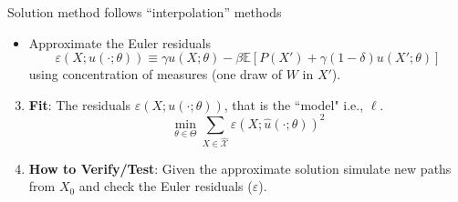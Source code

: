 \documentclass[aspectratio=169,10pt]{beamer}
\newcommand{\emphcolor}[1]{\textbf{\textcolor{emphcolorval}{#1}}}
\newcommand{\expec}[2][]{\ensuremath{\mathbb{E}_{{#1}}\left[ {#2} \right]}}
\newcommand{\Xtrain}{\hat{\mathcal{X}}}
\begin{document}
	\begin{frame}[label= algo]{Solution method follows ``interpolation'' methods}
		\begin{itemize}
			\item Approximate the Euler residuals
			$$\varepsilon\left(X;u(\cdot;\theta)\right) \equiv \gamma u(X;\theta) - \beta \mathbb{E}\left[P(X') +\gamma (1-\delta) u(X';\theta)\right]$$
			\vspace{-0.1in}
			 using concentration of measures (one draw of $W$ in $X'$). \hyperlink{errors}{}
		\end{itemize}
	\begin{enumerate}
		  \setcounter{enumi}{2}
		  \item \emphcolor{Fit}: The residuals $\varepsilon\left(X;u(\cdot;\theta)\right)$, that is the ``model" i.e., $\ell$.
		  $$
		  \min_{\theta \in \Theta} \sum_{X \in \Xtrain} \varepsilon\left(X;\hat{u}(\cdot;\theta)\right)^2
		    $$ 
	    \item  \emphcolor{How to Verify/Test}: Given the approximate solution simulate new paths from $X_0$ and check the Euler residuals ($\varepsilon$). 
	\end{enumerate}
	\end{frame}

	
	
	
	
\end{document}
